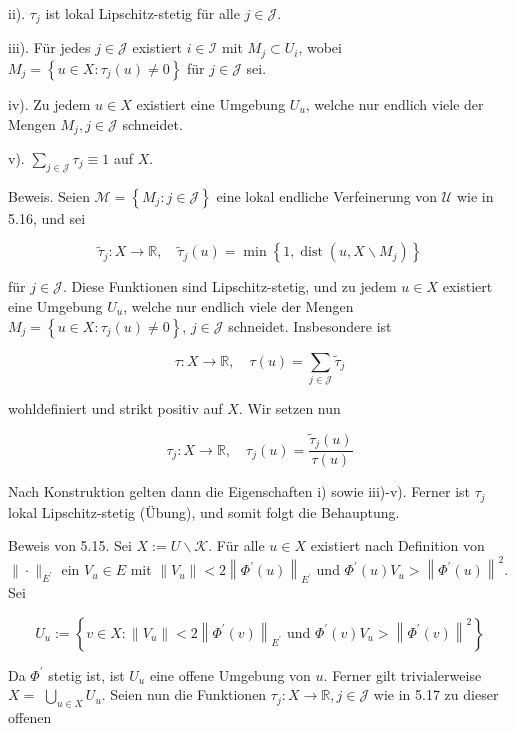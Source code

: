 \documentclass[10pt, letterpaper]{article}
\begin{document}
ii). $\tau_{j}$ ist lokal Lipschitz-stetig für alle $j \in \mathcal{J}$.

iii). Für jedes $j \in \mathcal{J}$ existiert $i \in \mathcal{I}$ mit $M_{j} \subset U_{i}$, wobei $M_{j}=\left\{u \in X: \tau_{j}(u) \neq 0\right\}$ für $j \in \mathcal{J}$ sei.

iv). Zu jedem $u \in X$ existiert eine Umgebung $U_{u}$, welche nur endlich viele der Mengen $M_{j}, j \in \mathcal{J}$ schneidet.

v). $\sum_{j \in \mathcal{J}} \tau_{j} \equiv 1$ auf $X$.

Beweis. Seien $\mathcal{M}=\left\{M_{j}: j \in \mathcal{J}\right\}$ eine lokal endliche Verfeinerung von $\mathcal{U}$ wie in 5.16, und sei

$$
\tilde{\tau}_{j}: X \rightarrow \mathbb{R}, \quad \tilde{\tau}_{j}(u)=\min \left\{1, \operatorname{dist}\left(u, X \backslash M_{j}\right)\right\}
$$

für $j \in \mathcal{J}$. Diese Funktionen sind Lipschitz-stetig, und zu jedem $u \in X$ existiert eine Umgebung $U_{u}$, welche nur endlich viele der Mengen $M_{j}=\left\{u \in X: \tau_{j}(u) \neq 0\right\}$, $j \in \mathcal{J}$ schneidet. Insbesondere ist

$$
\tau: X \rightarrow \mathbb{R}, \quad \tau(u)=\sum_{j \in \mathcal{J}} \tilde{\tau}_{j}
$$

wohldefiniert und strikt positiv auf $X$. Wir setzen nun

$$
\tau_{j}: X \rightarrow \mathbb{R}, \quad \tau_{j}(u)=\frac{\tilde{\tau}_{j}(u)}{\tau(u)}
$$

Nach Konstruktion gelten dann die Eigenschaften i) sowie iii)-v). Ferner ist $\tau_{j}$ lokal Lipschitz-stetig (Übung), und somit folgt die Behauptung.

Beweis von 5.15. Sei $X:=U \backslash \mathcal{K}$. Für alle $u \in X$ existiert nach Definition von $\|\cdot\|_{E^{\prime}}$ ein $V_{u} \in E$ mit $\left\|V_{u}\right\|<2\left\|\Phi^{\prime}(u)\right\|_{E^{\prime}}$ und $\Phi^{\prime}(u) V_{u}>\left\|\Phi^{\prime}(u)\right\|^{2}$. Sei

$$
U_{u}:=\left\{v \in X:\left\|V_{u}\right\|<2\left\|\Phi^{\prime}(v)\right\|_{E^{\prime}} \text { und } \Phi^{\prime}(v) V_{u}>\left\|\Phi^{\prime}(v)\right\|^{2}\right\}
$$

Da $\Phi^{\prime}$ stetig ist, ist $U_{u}$ eine offene Umgebung von $u$. Ferner gilt trivialerweise $X=$ $\bigcup_{u \in X} U_{u}$. Seien nun die Funktionen $\tau_{j}: X \rightarrow \mathbb{R}, j \in \mathcal{J}$ wie in 5.17 zu dieser offenen
\end{document}
